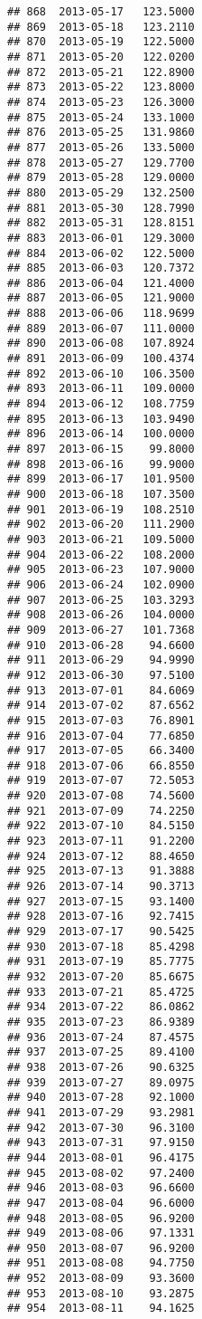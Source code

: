 \documentclass[
]{article}
\begin{document}
\begin{verbatim}
## 868  2013-05-17   123.5000
## 869  2013-05-18   123.2110
## 870  2013-05-19   122.5000
## 871  2013-05-20   122.0200
## 872  2013-05-21   122.8900
## 873  2013-05-22   123.8000
## 874  2013-05-23   126.3000
## 875  2013-05-24   133.1000
## 876  2013-05-25   131.9860
## 877  2013-05-26   133.5000
## 878  2013-05-27   129.7700
## 879  2013-05-28   129.0000
## 880  2013-05-29   132.2500
## 881  2013-05-30   128.7990
## 882  2013-05-31   128.8151
## 883  2013-06-01   129.3000
## 884  2013-06-02   122.5000
## 885  2013-06-03   120.7372
## 886  2013-06-04   121.4000
## 887  2013-06-05   121.9000
## 888  2013-06-06   118.9699
## 889  2013-06-07   111.0000
## 890  2013-06-08   107.8924
## 891  2013-06-09   100.4374
## 892  2013-06-10   106.3500
## 893  2013-06-11   109.0000
## 894  2013-06-12   108.7759
## 895  2013-06-13   103.9490
## 896  2013-06-14   100.0000
## 897  2013-06-15    99.8000
## 898  2013-06-16    99.9000
## 899  2013-06-17   101.9500
## 900  2013-06-18   107.3500
## 901  2013-06-19   108.2510
## 902  2013-06-20   111.2900
## 903  2013-06-21   109.5000
## 904  2013-06-22   108.2000
## 905  2013-06-23   107.9000
## 906  2013-06-24   102.0900
## 907  2013-06-25   103.3293
## 908  2013-06-26   104.0000
## 909  2013-06-27   101.7368
## 910  2013-06-28    94.6600
## 911  2013-06-29    94.9990
## 912  2013-06-30    97.5100
## 913  2013-07-01    84.6069
## 914  2013-07-02    87.6562
## 915  2013-07-03    76.8901
## 916  2013-07-04    77.6850
## 917  2013-07-05    66.3400
## 918  2013-07-06    66.8550
## 919  2013-07-07    72.5053
## 920  2013-07-08    74.5600
## 921  2013-07-09    74.2250
## 922  2013-07-10    84.5150
## 923  2013-07-11    91.2200
## 924  2013-07-12    88.4650
## 925  2013-07-13    91.3888
## 926  2013-07-14    90.3713
## 927  2013-07-15    93.1400
## 928  2013-07-16    92.7415
## 929  2013-07-17    90.5425
## 930  2013-07-18    85.4298
## 931  2013-07-19    85.7775
## 932  2013-07-20    85.6675
## 933  2013-07-21    85.4725
## 934  2013-07-22    86.0862
## 935  2013-07-23    86.9389
## 936  2013-07-24    87.4575
## 937  2013-07-25    89.4100
## 938  2013-07-26    90.6325
## 939  2013-07-27    89.0975
## 940  2013-07-28    92.1000
## 941  2013-07-29    93.2981
## 942  2013-07-30    96.3100
## 943  2013-07-31    97.9150
## 944  2013-08-01    96.4175
## 945  2013-08-02    97.2400
## 946  2013-08-03    96.6600
## 947  2013-08-04    96.6000
## 948  2013-08-05    96.9200
## 949  2013-08-06    97.1331
## 950  2013-08-07    96.9200
## 951  2013-08-08    94.7750
## 952  2013-08-09    93.3600
## 953  2013-08-10    93.2875
## 954  2013-08-11    94.1625

\end{verbatim}
\end{document}
